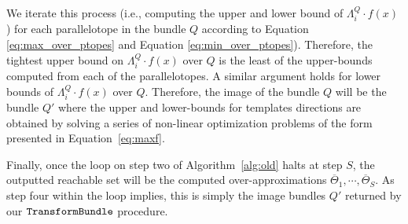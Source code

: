 We iterate this process (i.e., computing the upper and lower bound of $\Lambda^Q_{i}\cdot f(x)$) for each parallelotope in the bundle $Q$ according to Equation \ref{eq:max_over_ptopes} and Equation \ref{eq:min_over_ptopes}).
%
%
Therefore, the tightest upper bound on $\Lambda^Q_{i}\cdot f(x)$ over $Q$ is the least of the upper-bounds computed from each of the parallelotopes.
%
A similar argument holds for lower bounds of $\Lambda^Q_{i}\cdot f(x)$ over $Q$.
%
%
Therefore, the image of the bundle $Q$ will be the bundle $Q'$ where the upper and lower-bounds for templates directions are obtained by solving a series of non-linear optimization problems of the form presented in Equation~\ref{eq:maxf}.


Finally, once the loop on step two of Algorithm~\ref{alg:old} halts at step $S$, the outputted reachable set will be the computed over-approximations $\overline\Theta_1, \cdots, \overline\Theta_S$. As step four within the loop implies, this is simply the image bundles $Q'$ returned by our $\texttt{TransformBundle}$ procedure.







